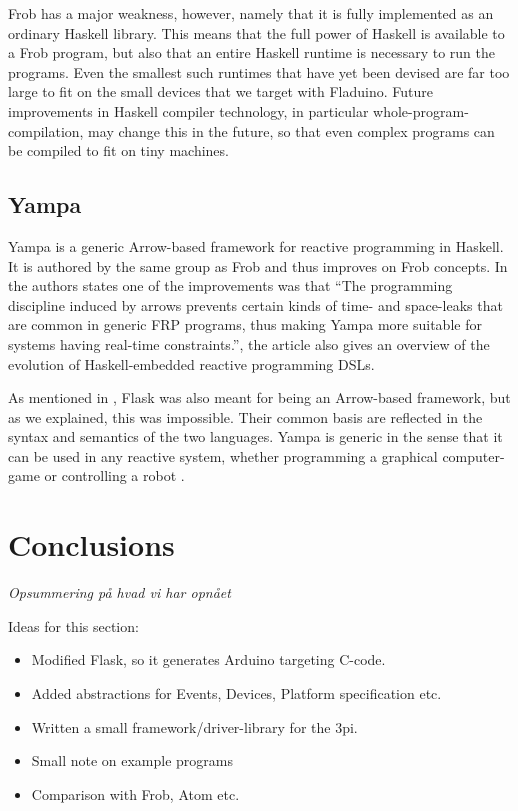 \documentclass[a4paper, oneside, final]{memoir}
\let\Fref\undefined
\begin{document}
Frob has a major weakness, however, namely that it is fully
implemented as an ordinary Haskell library.  This means that the full
power of Haskell is available to a Frob program, but also that an
entire Haskell runtime is necessary to run the programs.  Even the
smallest such runtimes that have yet been devised are far too large to
fit on the small devices that we target with Fladuino.  Future
improvements in Haskell compiler technology, in particular
whole-program-compilation, may change this in the future, so that even
complex programs can be compiled to fit on tiny machines.

\section{Yampa}
Yampa is a generic Arrow-based framework for reactive programming in
Haskell. It is authored by the same group as Frob and thus improves on
Frob concepts. In \cite{arrowsrobotsfrp02} the authors states one of
the improvements was that ``The programming discipline induced by
arrows prevents certain kinds of time- and space-leaks that are common
in generic FRP programs, thus making Yampa more suitable for systems
having real-time constraints.'', the article also gives an overview of
the evolution of Haskell-embedded reactive programming DSLs.

As mentioned in \Fref[plain]{chap:Flask}, Flask was also meant for
being an Arrow-based framework, but as we explained, this was
impossible. Their common basis are reflected in the syntax and
semantics of the two languages. Yampa is generic in the sense that it
can be used in any reactive system, whether programming a graphical
computer-game \cite{Courtney2003b} or controlling a robot
\cite{arrowsrobotsfrp02}.


\chapter{Conclusions}
\textit{Opsummering på hvad vi har opnået}

Ideas for this section:
\begin{itemize}
\item Modified Flask, so it generates Arduino targeting C-code.
\item Added abstractions for Events, Devices, Platform specification etc.
\item Written a small framework/driver-library for the 3pi.
\item Small note on example programs
\item Comparison with Frob, Atom etc.
\end{itemize}
\end{document}
